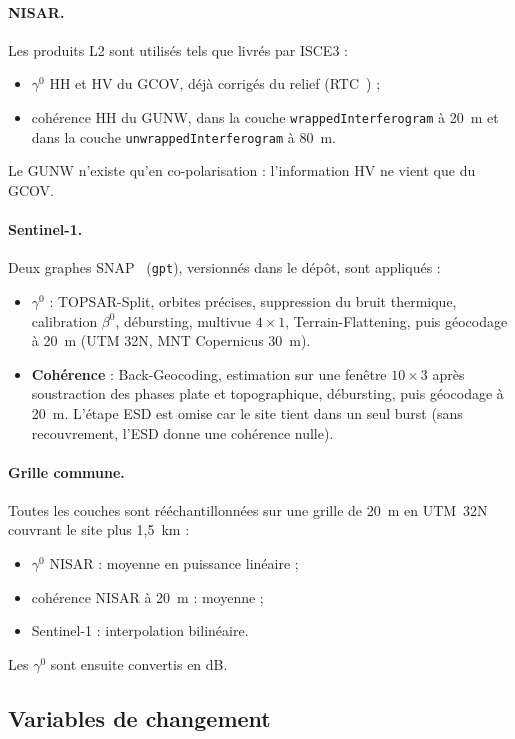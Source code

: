 \documentclass[11pt,a4paper]{article}
\begin{document}
\paragraph{NISAR.} Les produits L2 sont utilisés tels que livrés par ISCE3 :
\begin{itemize}
\item $\gamma^0$ HH et HV du GCOV, déjà corrigés du relief (RTC~\cite{small2011flattening}) ;
\item cohérence HH du GUNW, dans la couche \texttt{wrappedInterferogram} à 20~m et dans la couche
  \texttt{unwrappedInterferogram} à 80~m.
\end{itemize}
Le GUNW n'existe qu'en co-polarisation : l'information HV ne vient que du GCOV.

\paragraph{Sentinel-1.} Deux graphes SNAP~\cite{snap} (\texttt{gpt}), versionnés dans le dépôt, sont appliqués :
\begin{itemize}
\item \textbf{$\gamma^0$} : TOPSAR-Split, orbites précises, suppression du bruit thermique, calibration $\beta^0$, débursting,
  multivue $4\times1$, Terrain-Flattening, puis géocodage à 20~m (UTM 32N, MNT Copernicus 30~m).
\item \textbf{Cohérence} : Back-Geocoding, estimation sur une fenêtre $10\times3$ après soustraction des phases
  plate et topographique, débursting, puis géocodage à 20~m. L'étape ESD est omise car le site tient dans un seul
  burst (sans recouvrement, l'ESD donne une cohérence nulle).
\end{itemize}

\paragraph{Grille commune.} Toutes les couches sont rééchantillonnées sur une grille de 20~m en UTM~32N couvrant
le site plus 1,5~km :
\begin{itemize}
\item $\gamma^0$ NISAR : moyenne en puissance linéaire ;
\item cohérence NISAR à 20~m : moyenne ;
\item Sentinel-1 : interpolation bilinéaire.
\end{itemize}
Les $\gamma^0$ sont ensuite convertis en dB.

\subsection{Variables de changement}
\end{document}
